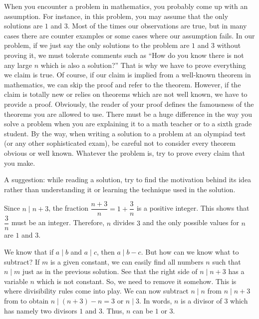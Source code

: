 When you encounter a problem in mathematics, you probably come up with an assumption. For instance, in this problem, you may assume that the only solutions are $1$ and $3$. Most of the times our observations are true, but in many cases there are counter examples or some cases where our assumption fails. In our problem, if we just say the only solutions to the problem are $1$ and $3$ without proving it, we must tolerate comments such as ``How do you know there is not any large $n$ which is also a solution?'' That is why we have to prove everything we claim is true. Of course, if our claim is implied from a well-known theorem in mathematics, we can skip the proof and refer to the theorem. However, if the claim is totally new or relies on theorems which are not well known, we have to provide a proof. Obviously, the reader of your proof defines the famousness of the theorems you are allowed to use. There must be a huge difference in the way you solve a problem when you are explaining it to a math teacher or to a sixth grade student. By the way, when writing a solution to a problem at an olympiad test (or any other sophisticated exam), be careful not to consider every theorem obvious or well known. Whatever the problem is, try to prove every claim that you make.

A suggestion: while reading a solution, try to find the motivation behind its idea rather than understanding it or learning the technique used in the solution.

	\begin{solution}
		Since $n\mid n+3$, the fraction $\dfrac{n+3}{n}=1+\dfrac{3}{n}$ is a positive integer. This shows that $\dfrac{3}{n}$ must be an integer. Therefore, $n$ divides $3$ and the only possible values for $n$ are $1$ and $3$.
	\end{solution}

	\begin{solution}
		We know that if $a\mid b$ and $a\mid c$, then $a\mid b-c$. But how can we know what to subtract? If $m$ is a given constant, we can easily find all numbers $n$ such that $n\mid m$ just as in the previous solution. See that the right side of $n\mid n+3$ has a variable $n$ which is not constant. So, we need to remove it somehow. This is where divisibility rules come into play. We can now subtract $n\mid n$ from $n\mid n+3$ from to obtain $n\mid (n+3)-n=3$ or $n\mid 3$. In words, $n$ is a divisor of $3$ which has namely two divisors $1$ and $3$. Thus, $n$ can be $1$ or $3$.
	\end{solution}

